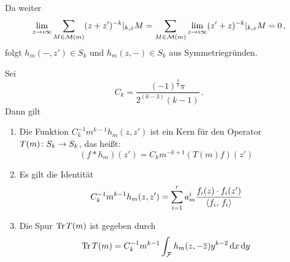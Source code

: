 Da weiter
\begin{align*}
\lim_{z \to i\infty} \sum_{M \in \mathcal{M}(m)} (z+z')^{-k}|_{k,z} M
= \sum_{M \in \mathcal{M}(m)} \lim_{z \to i\infty} (z'+z)^{-k}|_{k,z} M
= 0\,,
\end{align*}
folgt $h_m(-, z') \in S_k$ und $h_m(z, -) \in S_k$ aus Symmetriegründen.


\begin{satz}\label{analytischeSpurformel}
	Sei
	\begin{equation}%
	C_k = \frac{(-1)^{\frac{k}{2}} \pi}{2^{(k-3)}(k-1)}\,.
	\end{equation}
	Dann gilt
	\begin{enumerate}
		\item Die Funktion $C_k^{-1} m^{k-1} h_m(z,z')$ ist ein Kern für den Operator $T(m)\colon S_k \rightarrow S_k$, das heißt:
		\begin{equation}\label{eq:faltung_hm}%
		(f * h_m)(z') = C_km^{-k+1} (T(m)f)(z')
		\end{equation}
		\item Es gilt die Identität 
		\begin{equation}%
		C_k^{-1} m^{k-1} h_m(z,z') = \sum_{i=1}^r a_m^i \frac{f_i(z) \cdot f_i(z')}{\scalarprd{f_i}{f_i}}
		\end{equation}
		\item Die Spur $\operatorname{Tr} T(m)$ ist gegeben durch
		\begin{equation}%
		\Tr T(m) = C_k^{-1} m^{k-1} \int_\F h_m(z, -\conj z) y^{k-2} \opd x \opd y
		\end{equation}
	\end{enumerate}
\end{satz}

